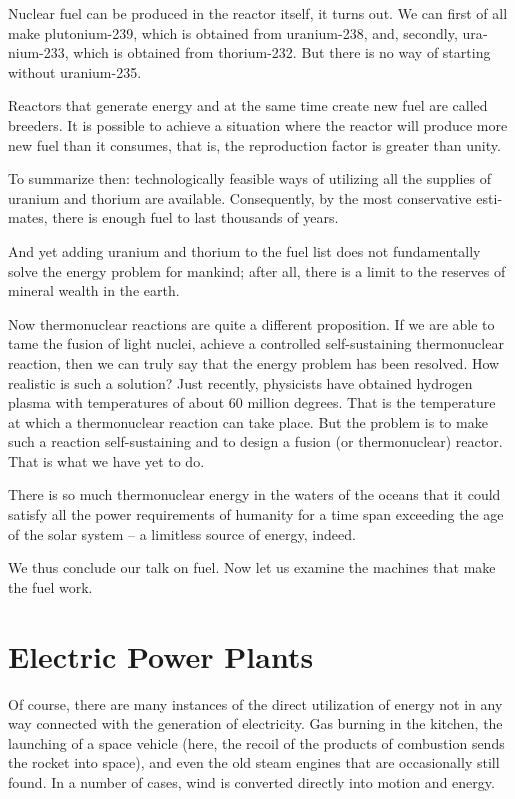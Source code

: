 Nuclear fuel can be produced in the reactor itself, it turns out. We can first of all make plutonium-239, which is obtained from uranium-238, and, secondly, ura­nium-233, which is obtained from thorium-232. But there is no way of starting without uranium-235.

Reactors that generate energy and at the same time create new fuel are called breeders. It is possible to achieve a situation where the reactor will produce more new fuel than it consumes, that is, the reproduction factor is greater than unity.

To summarize then: technologically feasible ways of utilizing all the supplies of uranium and thorium are available. Consequently, by the most conservative esti­mates, there is enough fuel to last thousands of years.

And yet adding uranium and thorium to the fuel list does not fundamentally solve the energy problem for mankind; after all, there is a limit to the reserves of mineral wealth in the earth.

Now thermonuclear reactions are quite a different prop­osition. If we are able to tame the fusion of light nuclei, achieve a controlled self-sustaining thermonuclear reaction, then we can truly say that the energy problem has been resolved. How realistic is such a solution? Just recent­ly, physicists have obtained hydrogen plasma with temper­atures of about 60 million degrees. That is the temperature at which a thermonuclear reaction can take place. But the problem is to make such a reaction self-sustaining and to design a fusion (or thermonuclear) reactor. That is what we have yet to do.

There is so much thermonuclear energy in the waters of the oceans that it could satisfy all the power require­ments of humanity for a time span exceeding the age of the solar system -- a limitless source of energy, indeed.

We thus conclude our talk on fuel. Now let us examine the machines that make the fuel work.

\section{Electric Power Plants}

Of course, there are many instances of the direct util­ization of energy not in any way connected with the generation of electricity. Gas burning in the kitchen, the launching of a space vehicle (here, the recoil of the products of combustion sends the rocket into space), and even the old steam engines that are occasionally still found. In a number of cases, wind is converted directly into motion and energy.

